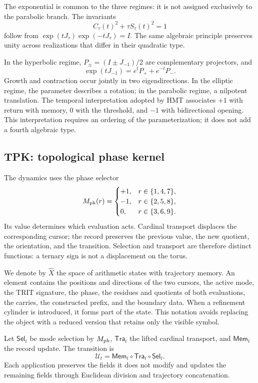 The exponential is common to the three regimes: it is not assigned exclusively to the parabolic branch. The invariants
\[
 C_\tau(t)^2+\tau S_\tau(t)^2=1
\]
follow from \(\exp(tJ_\tau)\exp(-tJ_\tau)=I\). The same algebraic principle preserves unity across realizations that differ in their quadratic type.

In the hyperbolic regime, \(P_\pm=(I\pm J_{-1})/2\) are complementary projectors, and
\[
 \exp(tJ_{-1})=e^tP_++e^{-t}P_-.
\]
Growth and contraction occur jointly in two eigendirections. In the elliptic regime, the parameter describes a rotation; in the parabolic regime, a nilpotent translation. The temporal interpretation adopted by HMT associates \(+1\) with return with memory, \(0\) with the threshold, and \(-1\) with bidirectional opening. This interpretation requires an ordering of the parameterization; it does not add a fourth algebraic type.





\subsection{TPK: topological phase kernel}

The dynamics uses the phase selector
\[
 M_{\rm ph}(r)=
 \begin{cases}
 +1,&r\in\{1,4,7\},\\
 -1,&r\in\{2,5,8\},\\
 0,&r\in\{3,6,9\}.
 \end{cases}
\]
Its value determines which evaluation acts. Cardinal transport displaces the corresponding cursor; the record preserves the previous value, the new quotient, the orientation, and the transition. Selection and transport are therefore distinct functions: a ternary sign is not a displacement on the torus.

We denote by \(\widehat X\) the space of arithmetic states with trajectory memory. An element contains the positions and directions of the two cursors, the active mode, the TRIT signature, the phase, the residues and quotients of both evaluations, the carries, the constructed prefix, and the boundary data. When a refinement cylinder is introduced, it forms part of the state. This notation avoids replacing the object with a reduced version that retains only the visible symbol.

\begin{definition}
Let \(\mathsf{Sel}_t\) be mode selection by \(M_{\rm ph}\), \(\mathsf{Tra}_t\) the lifted cardinal transport, and \(\mathsf{Mem}_t\) the record update. The transition is
\begin{equation}
 \mathcal U_t=\mathsf{Mem}_t\circ\mathsf{Tra}_t\circ\mathsf{Sel}_t.
 \label{eq:actualizacion}
\end{equation}
Each application preserves the fields it does not modify and updates the remaining fields through Euclidean division and trajectory concatenation.
\end{definition}


